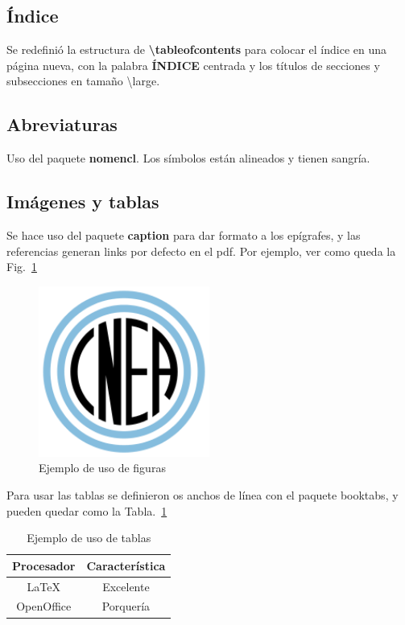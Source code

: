 \documentclass[a4paper,11pt,twoside]{MECOM}
\begin{document}
    \subsection{\'Indice}
        Se redefini\'o la estructura de {\bf \textbackslash tableofcontents} para colocar el \'indice en una p\'agina nueva, con la palabra {\bf \'INDICE} centrada y los t\'itulos de secciones y subsecciones en tama\~no \textbackslash large.
        
        
    \subsection{Abreviaturas}
        Uso del paquete {\bf nomencl}. Los s\'imbolos est\'an alineados y tienen sangr\'ia.
        
    \subsection{Im\'agenes y tablas}
    Se hace uso del paquete {\bf caption} para dar formato a los ep\'igrafes, y las referencias generan links por defecto en el pdf. Por ejemplo, ver como queda la Fig.~\ref{fg:Logo_CNEA}
    \begin{figure}[ht]
        \centering
        \includegraphics[width=0.5\textwidth]{Logo_CNEA}
        \caption{Ejemplo de uso de figuras}
        \label{fg:Logo_CNEA}
    \end{figure}    
    
    \par
    Para usar las tablas se definieron os anchos de l\'inea con el paquete {booktabs}, y pueden quedar como la Tabla.~\ref{tab:prueba}
    \begin{table}[ht]
        \centering
        \begin{tabular}{c c}
            \toprule
            \bf Procesador & \bf Caracter\'istica \\
            \midrule
            \LaTeX{} & Excelente \\
            OpenOffice & Porquer\'ia\\
            \bottomrule
        \end{tabular}
        \caption{Ejemplo de uso de tablas}
        \label{tab:prueba}
    \end{table}    
    
\end{document}
